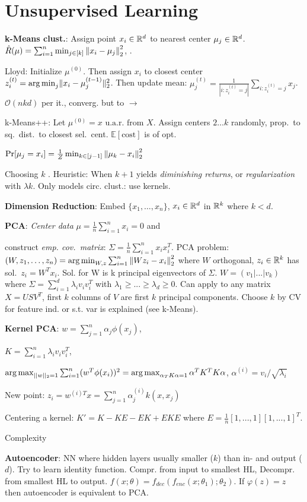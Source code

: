 \section{Unsupervised Learning}

\textbf{k-Means clust.}: Assign point $x_i \in \mathbb{R}^d$ to nearest center $\mu_j
\in \mathbb{R}^d$. $\hat{R}(\mu) = \sum_{i=1}^n \min_{j\in [k]} \left\lVert x_i - \mu_j\right\rVert_2^2$, .

Lloyd: Initialize $\mu^{(0)}$. Then assign $x_i$ to closest center $z_i^{(t)} =
\operatorname*{arg\,min}_j \lVert x_i - \mu_j^{(t-1)}\rVert_2^2$. Then update mean: $\mu_j^{(t)} =
\frac{1}{|i: z_i^{(t)}=j |} \sum_{i: z_i^{(t)}=j} x_j$. $\mathcal{O}(nkd)$
per it., converg.  but  to
 $\rightarrow$ 

k-Means++: Let $\mu^{(0)} = \text{$x$ u.a.r.\ from $X$}$. Assign centers
$2\dots k$ randomly, prop.\ to sq.\ dist.\ to closest sel.\ cent. $\mathbb{E}[\text{cost}]$ is  of opt.

$\Pr[\mu_j=x_i]=\frac{1}{Z} \min_{k\in [j-1]} \left\lVert\mu_k-x_i\right\rVert_2^2$

Choosing $k$ . Heuristic: When $k+1$ yields
\emph{diminishing returns}, or \emph{regularization} with $\lambda k$.
Only models circ. clust.: use kernels.

\textbf{Dimension Reduction}: Embed $\{x_1,\dots,x_n\}$, $x_i \in \mathbb{R}^d$ in $\mathbb{R}^k$ where $k < d$.

\textbf{PCA}: \emph{Center data} $\mu = \frac{1}{n} \sum_{i=1}^n x_i = 0$ and 

construct \emph{emp. cov.\ matrix}: $\Sigma = \frac{1}{n} \sum_{i=1}^n x_i x_i^T$.
PCA problem: $(W, z_1,\dots,z_n) = \operatorname*{arg\,min}_{W,z} \sum_{i=1}^n \left\lVert W z_i - x_i\right\rVert_2^2$
where $W$ orthogonal, $z_i \in \mathbb{R}^k$ has sol.\ $z_i = W^T x_i$. Sol. for W is k principal eigenvectors of $\Sigma$. $W = (v_1 | ... | v_k)$ where $\Sigma = \sum_{i=1}^d \lambda_i v_i v_i^T$ with $\lambda_1 \geq ... \geq \lambda_d \geq 0$. Can apply to any
matrix $X = U S V^T$, first $k$ columns of $V$ are first $k$ principal
components. Choose $k$ by CV for feature ind. or s.t. var is explained
(see k-Means).

\textbf{Kernel PCA}: $w = \sum_{j=1}^n \alpha_j \phi(x_j)$,

$K = \sum_{i=1}^n \lambda_i v_i v_i^T$, 

$\operatorname*{arg\,max}_{||w||_2 = 1} \sum_{i=1}^n (w^T \phi(x_i))^2 = \operatorname*{arg\,max}_{\alpha_T K \alpha = 1} \alpha^T K^T K \alpha$, $\alpha^{(i)} = v_i/\sqrt{\lambda_i}$

New point: $z_i = w^{(i)T}x = \sum_{j=1}^n \alpha_j^{(i)} k(x, x_j)$

Centering a kernel: $K' = K - KE - EK + EKE$ where $E = \frac{1}{n}[1,...,1][1,...,1]^T$.

Complexity 

\textbf{Autoencoder}: NN where hidden layers usually smaller ($k$) than in- and output ($d$). Try to learn identity function. Compr. from input to smallest HL, Decompr. from smallest HL to output. $f(x; \theta) = f_{dec}(f_{enc}(x; \theta_1);\theta_2)$. If $\varphi(z) = z$ then autoencoder is equivalent to PCA.

